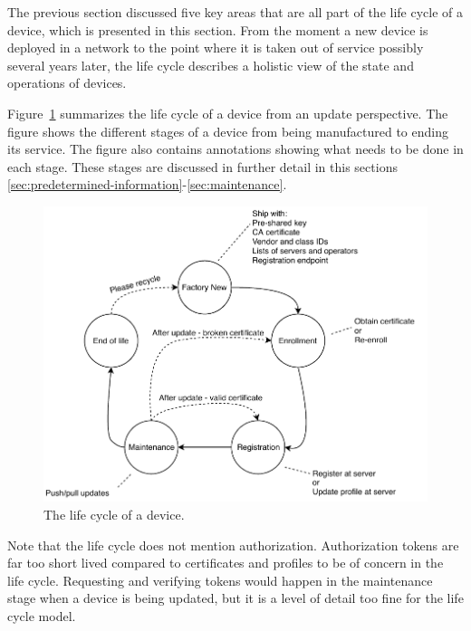 \documentclass[0-thesis.tex]{subfiles}
\begin{document}
The previous section discussed five key areas that are all part of the life cycle of a
device, which is presented in this section. From the moment a new device is deployed in a
network to the point where it is taken out of service possibly several years later, the
life cycle describes a holistic view of the state and operations of devices.

Figure~\ref{fig:lifecycle} summarizes the life cycle of a device from an update
perspective. The figure shows the different stages of a device from being manufactured to
ending its service. The figure also contains annotations showing what needs to be done in
each stage. These stages are discussed in further detail in this sections
\ref{sec:predetermined-information}-\ref{sec:maintenance}. 

\begin{figure}
    \caption{The life cycle of a device.}
    \label{fig:lifecycle}
    \includegraphics{images/lifecycle.pdf}
\end{figure}

Note that the life cycle does not mention authorization. Authorization tokens are far too
short lived compared to certificates and profiles to be of concern in the life cycle.
Requesting and verifying tokens would happen in the maintenance stage when a device is
being updated, but it is a level of detail too fine for the life cycle model.
\end{document}
